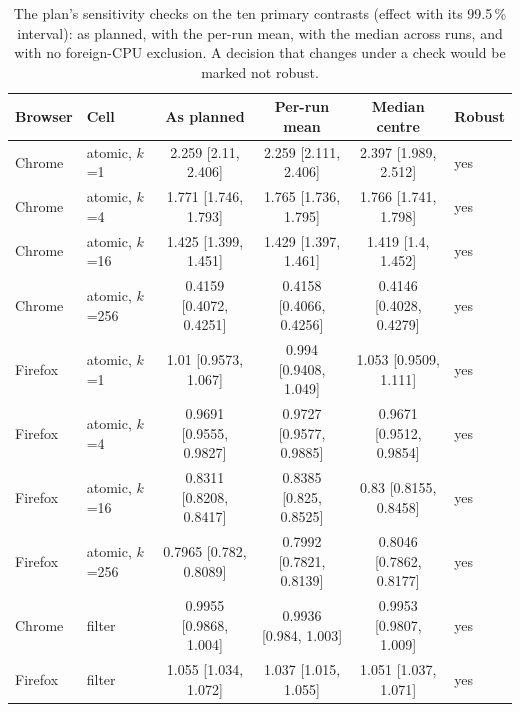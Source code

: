 \begin{table}[htbp]
\caption{The plan's sensitivity checks on the ten primary contrasts (effect with its 99.5\,\% interval): as planned, with the per-run mean, with the median across runs, and with no foreign-CPU exclusion. A decision that changes under a check would be marked not robust.}\label{tab:sensitivity}
\centering\footnotesize
\begin{tabular}{llcccl}
\toprule
Browser & Cell & As planned & Per-run mean & Median centre & Robust \\
\midrule
Chrome & atomic, $k$=1 & 2.259 [2.11, 2.406] & 2.259 [2.111, 2.406] & 2.397 [1.989, 2.512] & yes \\
Chrome & atomic, $k$=4 & 1.771 [1.746, 1.793] & 1.765 [1.736, 1.795] & 1.766 [1.741, 1.798] & yes \\
Chrome & atomic, $k$=16 & 1.425 [1.399, 1.451] & 1.429 [1.397, 1.461] & 1.419 [1.4, 1.452] & yes \\
Chrome & atomic, $k$=256 & 0.4159 [0.4072, 0.4251] & 0.4158 [0.4066, 0.4256] & 0.4146 [0.4028, 0.4279] & yes \\
Firefox & atomic, $k$=1 & 1.01 [0.9573, 1.067] & 0.994 [0.9408, 1.049] & 1.053 [0.9509, 1.111] & yes \\
Firefox & atomic, $k$=4 & 0.9691 [0.9555, 0.9827] & 0.9727 [0.9577, 0.9885] & 0.9671 [0.9512, 0.9854] & yes \\
Firefox & atomic, $k$=16 & 0.8311 [0.8208, 0.8417] & 0.8385 [0.825, 0.8525] & 0.83 [0.8155, 0.8458] & yes \\
Firefox & atomic, $k$=256 & 0.7965 [0.782, 0.8089] & 0.7992 [0.7821, 0.8139] & 0.8046 [0.7862, 0.8177] & yes \\
Chrome & filter & 0.9955 [0.9868, 1.004] & 0.9936 [0.984, 1.003] & 0.9953 [0.9807, 1.009] & yes \\
Firefox & filter & 1.055 [1.034, 1.072] & 1.037 [1.015, 1.055] & 1.051 [1.037, 1.071] & yes \\
\bottomrule
\end{tabular}
\end{table}
